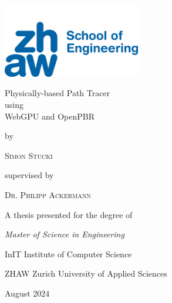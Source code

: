 
\begin{titlepage}
  \centering
  \includegraphics[width=6cm]{resources/zhaw-soe-logo.png}\par
  \vspace{4\baselineskip}
  {\Huge
    Physically-based Path Tracer\\ using \\ WebGPU and OpenPBR\par}
  \vspace{4\baselineskip}
  by\par
  {\Large\textsc{Simon Stucki}\par}
  \vspace{2\baselineskip}
  supervised by\par
  {\textsc{Dr. Philipp Ackermann}\par}
  \vfill
  A thesis presented for the degree of\par
  {\em Master of Science in Engineering}\par
  \vspace{1\baselineskip}
  InIT Institute of Computer Science\par
  ZHAW Zurich University of Applied Sciences\par
  \vspace{1\baselineskip}
  August 2024\par
\end{titlepage}
